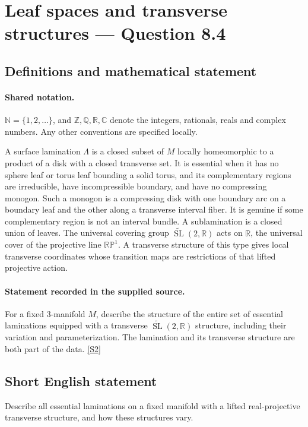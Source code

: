 \documentclass[11pt]{article}
\newcommand{\sref}[2]{\hyperlink{source:#1:#2}{[S#2]}}
\begin{document}
\section{Leaf spaces and transverse structures — Question 8.4}\label{statement}

\subsection{Definitions and mathematical statement}

\paragraph{Shared notation.}$\mathbb N=\{1,2,\ldots\}$, and $\mathbb Z,\mathbb Q,\mathbb R,\mathbb C$ denote the integers, rationals, reals and complex numbers. Any other conventions are specified locally.


A surface lamination $\Lambda$ is a closed subset of $M$ locally homeomorphic to a product of a disk with a closed transverse set. It is essential when it has no sphere leaf or torus leaf bounding a solid torus, and its complementary regions are irreducible, have incompressible boundary, and have no compressing monogon. Such a monogon is a compressing disk with one boundary arc on a boundary leaf and the other along a transverse interval fiber. It is genuine if some complementary region is not an interval bundle. A sublamination is a closed union of leaves. The universal covering group $\widetilde{\operatorname{SL}}(2,\mathbb R)$ acts on $\mathbb R$, the universal cover of the projective line $\mathbb{RP}^1$. A transverse structure of this type gives local transverse coordinates whose transition maps are restrictions of that lifted projective action.
\paragraph{Statement recorded in the supplied source.}
For a fixed $3$-manifold $M$, describe the structure of the entire set of essential laminations equipped with a transverse $\widetilde{\operatorname{SL}}(2,\mathbb R)$ structure, including their variation and parameterization. The lamination and its transverse structure are both part of the data. \sref{statement}{2}
\subsection{Short English statement}
Describe all essential laminations on a fixed manifold with a lifted real-projective transverse structure, and how these structures vary.
\end{document}
